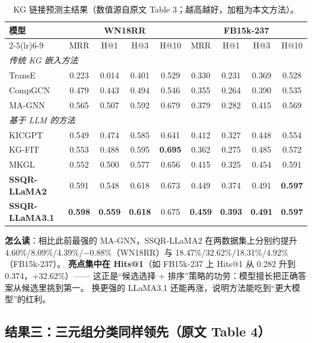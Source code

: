 \documentclass[11pt,UTF8,fontset=fandol]{ctexart}
\begin{document}
\begin{table}[H]\centering
\caption{KG 链接预测主结果（数值源自原文 Table 3；越高越好，加粗为本文方法）。}
\begin{tabular}{lcccc cccc}
\toprule
\multirow{2}{*}{模型} & \multicolumn{4}{c}{WN18RR} & \multicolumn{4}{c}{FB15k-237} \\
\cmidrule(lr){2-5}\cmidrule(lr){6-9}
 & MRR & H@1 & H@3 & H@10 & MRR & H@1 & H@3 & H@10 \\
\midrule
\multicolumn{9}{l}{\textit{传统 KG 嵌入方法}}\\
TransE        & 0.223 & 0.014 & 0.401 & 0.529 & 0.330 & 0.231 & 0.369 & 0.528 \\
CompGCN       & 0.479 & 0.443 & 0.494 & 0.546 & 0.355 & 0.264 & 0.390 & 0.535 \\
MA-GNN        & 0.565 & 0.507 & 0.592 & 0.679 & 0.379 & 0.282 & 0.415 & 0.569 \\
\midrule
\multicolumn{9}{l}{\textit{基于 LLM 的方法}}\\
KICGPT        & 0.549 & 0.474 & 0.585 & 0.641 & 0.412 & 0.327 & 0.448 & 0.554 \\
KG-FIT        & 0.553 & 0.488 & 0.595 & \textbf{0.695} & 0.362 & 0.275 & 0.485 & 0.572 \\
MKGL          & 0.552 & 0.500 & 0.577 & 0.656 & 0.415 & 0.325 & 0.454 & 0.591 \\
\textbf{SSQR-LLaMA2}   & 0.591 & 0.548 & 0.618 & 0.673 & 0.449 & 0.374 & 0.491 & \textbf{0.597} \\
\textbf{SSQR-LLaMA3.1} & \textbf{0.598} & \textbf{0.559} & \textbf{0.618} & 0.675 & \textbf{0.459} & \textbf{0.393} & \textbf{0.491} & \textbf{0.597} \\
\bottomrule
\end{tabular}
\end{table}

\textbf{怎么读}：相比此前最强的 MA-GNN，SSQR-LLaMA2 在两数据集上分别约提升
4.60\%/8.09\%/4.39\%/$-0.88\%$（WN18RR）与 18.47\%/32.62\%/18.31\%/4.92\%（FB15k-237）。
\textbf{亮点集中在 Hits@1}（如 FB15k-237 上 Hits@1 从 0.282 升到 0.374，+32.62\%）——
这正是“候选选择 + 排序”策略的功劳：模型擅长把正确答案从候选里挑到第一。
换更强的 LLaMA3.1 还能再涨，说明方法能吃到“更大模型”的红利。

\subsection{结果三：三元组分类同样领先（原文 Table 4）}
\end{document}
